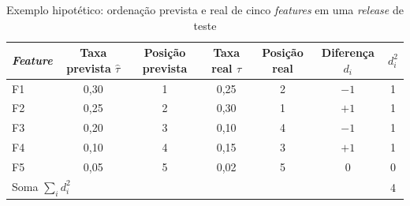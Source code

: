 \begin{table}[htbp]
    \centering
    \footnotesize
    \caption{Exemplo hipotético: ordenação prevista e real de cinco \textit{features} em uma \textit{release} de teste}
    \label{tab:met-ex-spearman}
    \begin{tabular}{lcccccc}
        \toprule
        \textit{Feature} & Taxa prevista $\hat{\tau}$ & Posição prevista & Taxa real $\tau$ & Posição real &
            Diferença $d_i$ & $d_i^2$ \\
        \midrule
        F1 & 0,30 & 1 & 0,25 & 2 & $-1$ & 1 \\
        F2 & 0,25 & 2 & 0,30 & 1 & $+1$ & 1 \\
        F3 & 0,20 & 3 & 0,10 & 4 & $-1$ & 1 \\
        F4 & 0,10 & 4 & 0,15 & 3 & $+1$ & 1 \\
        F5 & 0,05 & 5 & 0,02 & 5 & $0$  & 0 \\
        \midrule
        \multicolumn{6}{l}{Soma $\sum_i d_i^2$} & 4 \\
        \bottomrule
    \end{tabular}
\end{table}%
